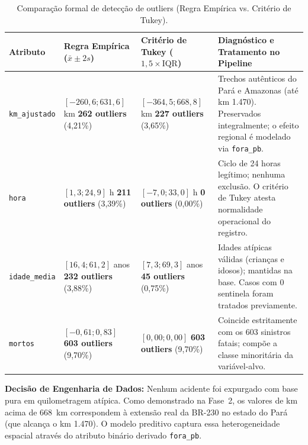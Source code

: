 \documentclass[11pt,a4paper]{article}
\begin{document}
\begin{table}[H]
  \centering
  \small
  \renewcommand{\arraystretch}{1.3}
  \caption{Comparação formal de detecção de outliers (Regra Empírica vs. Critério de Tukey).}
  \label{tab:outliers_comparacao}
  \begin{tabularx}{\textwidth}{|>{\raggedright\arraybackslash}p{2.8cm}|Y|Y|L|}
    \hline
    \textbf{Atributo} & \textbf{Regra Empírica ($\bar{x} \pm 2s$)} & \textbf{Critério de Tukey ($1,5\times\text{IQR}$)} & \textbf{Diagnóstico e Tratamento no Pipeline} \\
    \hline
    \texttt{km\_ajustado} &
    $[-260,6 ; 631,6]$ km \newline \textbf{262 outliers} (4,21\%) &
    $[-364,5 ; 668,8]$ km \newline \textbf{227 outliers} (3,65\%) &
    Trechos autênticos do Pará e Amazonas (até km 1.470). Preservados integralmente; o efeito regional é modelado via \texttt{fora\_pb}. \\
    \hline
    \texttt{hora} &
    $[1,3 ; 24,9]$ h \newline \textbf{211 outliers} (3,39\%) &
    $[-7,0 ; 33,0]$ h \newline \textbf{0 outliers} (0,00\%) &
    Ciclo de 24 horas legítimo; nenhuma exclusão. O critério de Tukey atesta normalidade operacional do registro. \\
    \hline
    \texttt{idade\_media} &
    $[16,4 ; 61,2]$ anos \newline \textbf{232 outliers} (3,88\%) &
    $[7,3 ; 69,3]$ anos \newline \textbf{45 outliers} (0,75\%) &
    Idades atípicas válidas (crianças e idosos); mantidas na base. Casos com 0 sentinela foram tratados previamente. \\
    \hline
    \texttt{mortos} &
    $[-0,61 ; 0,83]$ \newline \textbf{603 outliers} (9,70\%) &
    $[0,00 ; 0,00]$ \newline \textbf{603 outliers} (9,70\%) &
    Coincide estritamente com os 603 sinistros fatais; compõe a classe minoritária da variável-alvo. \\
    \hline
  \end{tabularx}
\end{table}

\textbf{Decisão de Engenharia de Dados:} Nenhum acidente foi expurgado com base pura em quilometragem atípica. Como demonstrado na Fase~2, os valores de km acima de 668~km correspondem à extensão real da BR-230 no estado do Pará (que alcança o km 1.470). O modelo preditivo captura essa heterogeneidade espacial através do atributo binário derivado \texttt{fora\_pb}.
\end{document}
